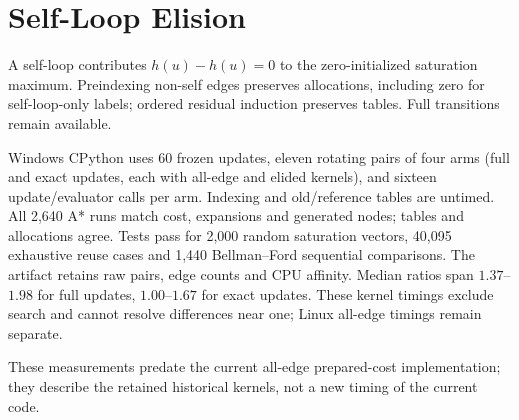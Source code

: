 \section{Self-Loop Elision}
A self-loop contributes $h(u)-h(u)=0$ to the zero-initialized saturation maximum.
Preindexing non-self edges preserves allocations, including zero for self-loop-only
labels; ordered residual induction preserves tables. Full transitions remain
available.

Windows CPython uses 60 frozen updates, eleven rotating pairs of four arms
(full and exact updates, each with all-edge and elided kernels), and sixteen
update/evaluator calls per arm. Indexing and old/reference tables are untimed.
All 2,640 A* runs match cost, expansions and generated nodes; tables and
allocations agree. Tests pass for
2,000 random saturation vectors, 40,095 exhaustive reuse cases and 1,440
Bellman--Ford sequential comparisons. The artifact retains raw pairs, edge
counts and CPU affinity. Median ratios span $1.37$--$1.98$
for full updates, $1.00$--$1.67$ for exact updates. These kernel timings exclude
search and cannot resolve differences near one; Linux all-edge timings remain
separate.

These measurements predate the current all-edge prepared-cost implementation;
they describe the retained historical kernels, not a new timing of the current code.
